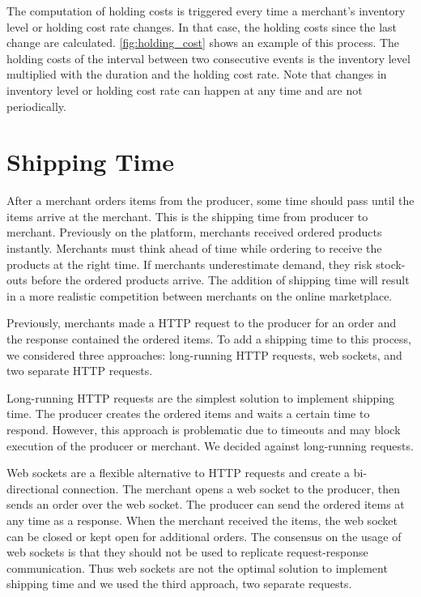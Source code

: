 The computation of holding costs is triggered every time a merchant's inventory level or holding cost rate changes.
In that case, the holding costs since the last change are calculated.
\cref{fig:holding_cost} shows an example of this process.
The holding costs of the interval between two consecutive events is the inventory level multiplied with the duration and the holding cost rate.
Note that changes in inventory level or holding cost rate can happen at any time and are not periodically.

\section{Shipping Time}
\label{section:shipping_time}
After a merchant orders items from the producer, some time should pass until the items arrive at the merchant.
This is the shipping time from producer to merchant.
Previously on the \pricewars platform, merchants received ordered products instantly.
Merchants must think ahead of time while ordering to receive the products at the right time.
If merchants underestimate demand, they risk stock-outs before the ordered products arrive.
The addition of shipping time will result in a more realistic competition between merchants on the online marketplace.

Previously, merchants made a HTTP request to the producer for an order and the response contained the ordered items.
To add a shipping time to this process, we considered three approaches: long-running HTTP requests, web sockets, and two separate HTTP requests. 

Long-running HTTP requests are the simplest solution to implement shipping time.
The producer creates the ordered items and waits a certain time to respond.
However, this approach is problematic due to timeouts and may block execution of the producer or merchant.
We decided against long-running requests.

Web sockets are a flexible alternative to HTTP requests and create a bi-directional connection.
The merchant opens a web socket to the producer, then sends an order over the web socket.
The producer can send the ordered items at any time as a response.
When the merchant received the items, the web socket can be closed or kept open for additional orders.
The consensus on the usage of web sockets is that they should not be used to replicate request-response communication.
Thus web sockets are not the optimal solution to implement shipping time and we used the third approach, two separate requests.

